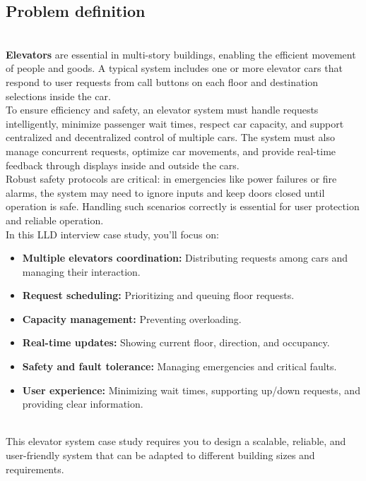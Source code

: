 

\subsection{Problem definition}\label{KfyitG1dioESlbYIcgWus-1}
\\
\textbf{Elevators} are essential in multi-story buildings, enabling the efficient movement of people and goods. A typical system includes one or more elevator cars that respond to user requests from call buttons on each floor and destination selections inside the car.
\\
To ensure efficiency and safety, an elevator system must handle requests intelligently, minimize passenger wait times, respect car capacity, and support centralized and decentralized control of multiple cars. The system must also manage concurrent requests, optimize car movements, and provide real-time feedback through displays inside and outside the cars.
\\
Robust safety protocols are critical: in emergencies like power failures or fire alarms, the system may need to ignore inputs and keep doors closed until operation is safe. Handling such scenarios correctly is essential for user protection and reliable operation.
\\
In this LLD interview case study, you'll focus on:

\begin{itemize}
\item
\protect{}\label{7ysMHeCvKrPak4seUScw_}
\textbf{Multiple elevators coordination:} Distributing requests among cars and managing their interaction.
\item
\protect{}\label{gDMPFNvvlQnki9c6CMGO5}
\textbf{Request scheduling:} Prioritizing and queuing floor requests.
\item
\protect{}\label{PIkZqKw0tB13HTKvTC4DV}
\textbf{Capacity management:} Preventing overloading.
\item
\protect{}\label{vN0qxhn22V2MbQzqE1rPc}
\textbf{Real-time updates:} Showing current floor, direction, and occupancy.
\item
\protect{}\label{zpGay_46QWSCE-NuJpBwI}
\textbf{Safety and fault tolerance:} Managing emergencies and critical faults.
\item
\protect{}\label{9os1a8w-empbO-QDjczNb}
\textbf{User experience:} Minimizing wait times, supporting up/down requests, and providing clear information.
\end{itemize}
\\
This elevator system case study requires you to design a scalable, reliable, and user-friendly system that can be adapted to different building sizes and requirements.

